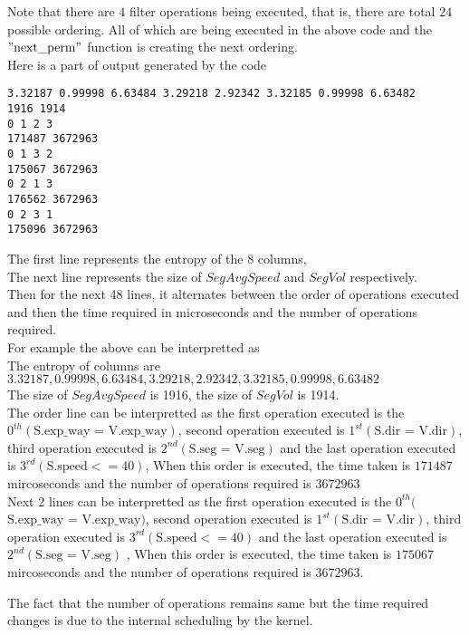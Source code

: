 Note that there are $4$ filter operations being executed, that is, there are total $24$ possible ordering. All of which are being executed in the above code and the $"\text{next\_perm}"$ function is creating the next ordering.\\
Here is a part of output generated by the code\\
\begin{lstlisting}
3.32187 0.99998 6.63484 3.29218 2.92342 3.32185 0.99998 6.63482 
1916 1914
0 1 2 3 
171487 3672963
0 1 3 2 
175067 3672963
0 2 1 3 
176562 3672963
0 2 3 1 
175096 3672963
\end{lstlisting}
The first line represents the entropy of the $8$ columns,\\
The next line represents the size of $SegAvgSpeed$ and $SegVol$ respectively.\\
Then for the next 48 lines, it alternates between the order of operations executed and then the time required in microseconds and the number of operations required.\\
For example the above can be interpretted as\\
The entropy of columns are $3.32187,0.99998,6.63484,3.29218,2.92342,3.32185,0.99998,6.63482$\\
The size of $SegAvgSpeed$ is 1916, the size of $SegVol$ is 1914.\\
The order line can be interpretted as the first operation executed is the $0^{th}(\text{S.exp\_way = V.exp\_way})$, second operation executed is $1^{st}(\text{S.dir = V.dir})$, third operation executed is $2^{nd}(\text{S.seg = V.seg})$ and the last operation executed is $3^{rd}(\text{S.speed} <= 40)$, When this order is executed, the time taken is $171487$ mircoseconds and the number of operations required is $3672963$\\
Next 2 lines can be interpretted as the first operation executed is the $0^{th}($$\text{S.exp\_way = V.exp\_way})$, second operation executed is $1^{st}(\text{S.dir = V.dir})$, third operation executed is $3^{rd}(\text{S.speed} <= 40)$ and the last operation executed is $2^{nd}(\text{S.seg = V.seg})$ , When this order is executed, the time taken is $175067$ mircoseconds and the number of operations required is $3672963$. 
\par The fact that the number of operations remains same but the time required changes is due to the internal scheduling by the kernel.
 
